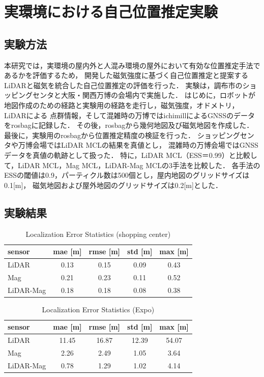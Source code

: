\section{実環境における自己位置推定実験}
\subsection{実験方法}
本研究では，実環境の屋内外と人混み環境の屋外において有効な位置推定手法であるかを評価するため，
開発した磁気強度に基づく自己位置推定と提案するLiDARと磁気を統合した自己位置推定の評価を行った．
実験は，調布市のショッピングセンタと大阪・関西万博の会場内で実施した．
はじめに，ロボットが地図作成のための経路と実験用の経路を走行し，磁気強度，オドメトリ，LiDARによる
点群情報，そして混雑時の万博ではichimillによるGNSSのデータをrosbagに記録した．
その後，rosbagから幾何地図及び磁気地図を作成した．
最後に，実験用のrosbagから位置推定精度の検証を行った．
ショッピングセンタや万博会場ではLiDAR MCLの結果を真値とし，
混雑時の万博会場ではGNSSデータを真値の軌跡として扱った．
特に，LiDAR MCL（ESS＝0.99）と比較して，LiDAR MCL，Mag MCL，LiDAR-Mag MCLの3手法を比較した．
各手法のESSの閾値は0.9，パーティクル数は500個とし，屋内地図のグリッドサイズは0.1[m]，
磁気地図および屋外地図のグリッドサイズは0.2[m]とした．

\subsection{実験結果}
\begin{table}[H]
  \centering
  \caption{Localization Error Statistics (shopping center)}
  \label{tab:error_shopping}
  \renewcommand{\arraystretch}{1.2}
  \begin{tabular}{|l|c|c|c|c|}
    \hline
    sensor & mae [m] & rmse [m] & std [m] & max [m] \\
    \hline
    LiDAR & 0.13 & 0.15 & 0.09 & 0.43 \\
    Mag   & 0.21 & 0.23 & 0.11 & 0.52 \\
    LiDAR-Mag & 0.18 & 0.18 & 0.08 & 0.38 \\
    \hline
  \end{tabular}
\end{table}

\begin{table}[H]
  \centering
  \caption{Localization Error Statistics (Expo)}
  \label{tab:error_expo_low}
  \renewcommand{\arraystretch}{1.2}
  \begin{tabular}{|l|c|c|c|c|}
    \hline
    sensor & mae [m] & rmse [m] & std [m] & max [m] \\
    \hline
    LiDAR & 11.45 & 16.87 & 12.39 & 54.07 \\
    Mag   & 2.26 & 2.49  & 1.05  & 3.64 \\
    LiDAR-Mag & 0.78 & 1.29  & 1.02  & 4.14 \\
    \hline
  \end{tabular}
\end{table}

